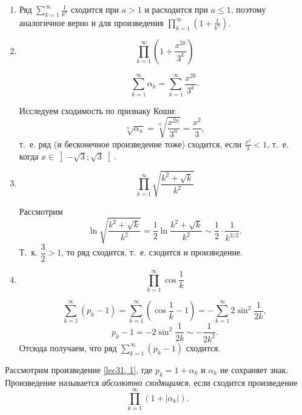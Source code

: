 \documentclass[../../main.tex]{subfiles}
\begin{document}
	\begin{examples}

		\;
	
		\begin{enumerate}
			\item Ряд $\sum\limits_{k = 1}^{\infty} \frac{1}{k^a}$ сходится при $a > 1$ 
			и 
			расходится при $a \leq 1$, поэтому аналогичное верно и для произведения 
			$\prod\limits_{k = 1}^{\infty} \left(1 + \frac{1}{k^a}\right)$.
			
			\item \[\prod\limits_{k = 1}^{\infty} \left(1 + \frac{x^{2k}}{3^k}\right)\]
			
			\[\sum\limits_{k = 1}^{\infty}\alpha_k = \sum\limits_{k = 1}^{\infty} 
			\frac{x^{2k}}{3^k}.\]
			
			Исследуем сходимость по признаку Коши: \[\sqrt[n]{\alpha_n} = 
			\sqrt[n]{\frac{x^{2n}}{3^n}} = \frac{x^2}{3},\] т.~е. ряд (и бесконечное 
			произведение тоже) сходится, если $\frac{x^2}{3} < 1$, т.~е. когда ${x \in 
			\left]-\sqrt{3}; \sqrt{3}\right[}.$
			
			\item \[\prod\limits_{k = 1}^{\infty} \sqrt{\frac{k^2 + \sqrt{k}}{k^2}}\]
			
			Рассмотрим \[\ln\sqrt{\frac{k^2 + \sqrt{k}}{k^2}} = \frac{1}{2}\ln\frac{k^2 
			+ \sqrt{k}}{k^2} \sim \frac{1}{2} \cdot \frac{1}{k^{3/2}}.\] Т.~к. 
			$\dfrac{3}{2} > 1$, то ряд сходится, т.~е. 
			сзодится и произведение.
			
			\item \[\prod\limits_{k = 1}^{\infty} \cos\frac{1}{k}\]
			
			\[\sum\limits_{k = 1}^{\infty}(p_k - 1) = \sum\limits_{k = 1}^{\infty} 
			(\cos\frac{1}{k} - 1) = -\sum\limits_{k = 1}^{\infty}2\sin^2\frac{1}{2k},\]
			\[p_k - 1 = -2\sin^2\frac{1}{2k} \sim -\frac{1}{2k^2}.\] Отсюда получаем, 
			что ряд
			$\sum\limits_{k = 1}^{\infty}(p_k - 1)$ сходится.
		\end{enumerate}	
	\end{examples}

	Рассмотрим произведение \eqref{lec31, 1}, где $p_k = 1 + \alpha_k$ и 
	$\alpha_k$ не сохраняет знак. Произведение называется \emph{абсолютно 
	сходящимся}, 
	если сходится произведение
	\begin{equation} \label{lec31, 6}
	 \prod\limits_{k = 1}^{\infty} (1 + |\alpha_k|).
	\end{equation}
	
\end{document}
